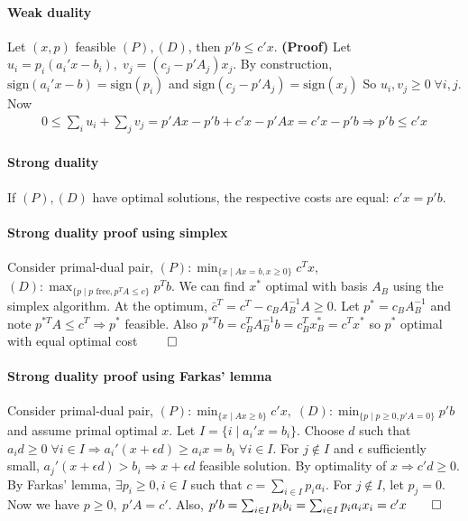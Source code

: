 \documentclass{article}
\begin{document}
\paragraph{Weak duality}
Let $(x,p)$ feasible $(P),(D)$, then $p'b \leq c'x$. \textbf{(Proof)} Let $u_i = p_i(a_i'x - b_i),\; v_j = (c_j - p'A_j)x_j$. By construction, $\text{sign}(a_i'x-b) = \text{sign}(p_i)$ and $\text{sign}(c_j - p'A_j) = \text{sign}(x_j)$ So $u_i, v_j \geq 0\; \forall i,j$. Now
\begin{align*}
    0 \leq \sum_i u_i + \sum_j v_j = p'Ax - p'b + c'x - p'Ax = c'x - p'b \Longrightarrow p'b \leq c'x
\end{align*} 

\paragraph{Strong duality} If $(P), (D)$ have optimal solutions, the respective costs are equal: $c'x = p'b$. 
\paragraph{Strong duality proof using simplex} Consider primal-dual pair, $(P):\min_{\{x \mid Ax = b, x\geq 0\}}c^Tx$, $(D):\max_{\{p \mid p\text{ free}, p^TA \leq c\}}p^Tb$. We can find $x^*$ optimal with basis $A_B$ using the simplex algorithm. At the optimum, $\bar c^T = c^T - c_BA_B^{-1}A \geq 0$. Let $p^* = c_BA_B^{-1}$ and note $p^{*T}A \leq c^T \Longrightarrow p^*$ feasible. Also $p^{*T}b = c_B^TA_B^{-1}b = c_B^Tx_B^* = c^Tx^*$ so $p^*$ optimal with equal optimal cost $\qed$

\paragraph{Strong duality proof using Farkas' lemma} Consider primal-dual pair, $(P):\min_{\{x\mid Ax\geq b\}}c'x,\; (D): \min_{\{p\mid p\geq 0, p'A=0\}}p'b$ and assume primal optimal $x$. Let $I = \{i\mid a_i'x = b_i\}$. Choose $d$ such that $a_id \geq 0\;\forall i \in I \Rightarrow a_i'(x + \epsilon d)\geq a_ix = b_i\;\forall i\in I$. For $j \notin I$ and $\epsilon$ sufficiently small, $a_j'(x + \epsilon d) > b_i \Rightarrow x + \epsilon d$ feasible solution. By optimality of $x\Rightarrow c'd \geq 0$. 
By Farkas' lemma, $\exists p_i\geq 0, i\in I$ such that $c = \sum_{i\in I}p_ia_i$. For $j\notin I$, let $p_j = 0$. Now we have $p\geq 0,\; p'A = c'$. Also, $p'b = \sum_{i\in I}p_ib_i = \sum_{i\in I}p_ia_ix_i = c'x \qed$ 
\end{document}
